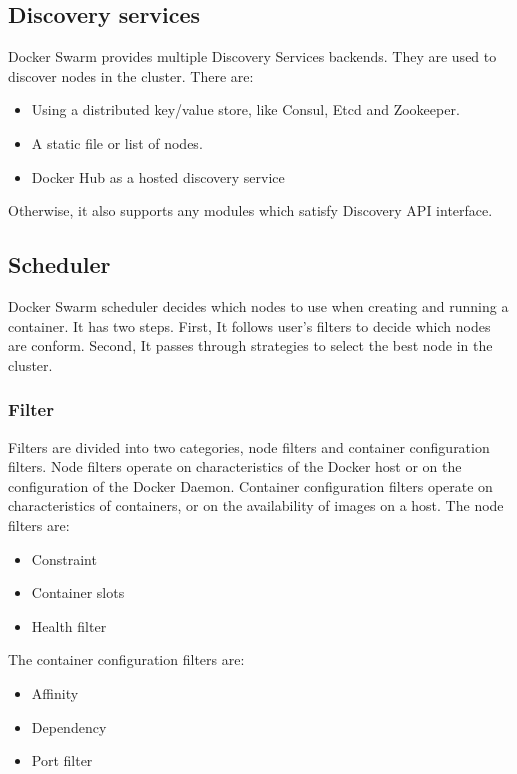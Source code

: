 \subsection{Discovery services}
Docker Swarm provides multiple Discovery Services backends. They are used to discover nodes in the cluster. There are:
\begin{itemize}
    \item Using a distributed key/value store, like Consul, Etcd and Zookeeper.
    \item A static file or list of nodes.
    \item Docker Hub as a hosted discovery service
\end{itemize}
Otherwise, it also supports any modules which satisfy Discovery API interface.

\subsection{Scheduler}
Docker Swarm scheduler decides which nodes to use when creating and running a container. It has two steps. First, It follows user's filters to decide which nodes are conform. Second, It passes through strategies to select the best node in the cluster.

\subsubsection{Filter}
Filters are divided into two categories, node filters and container configuration filters. Node filters operate on characteristics of the Docker host or on the configuration of the Docker Daemon. Container configuration filters operate on characteristics of containers, or on the availability of images on a host.
The node filters are:
\begin{itemize}
    \item Constraint
    \item Container slots
    \item Health filter
\end{itemize}
The container configuration filters are:
\begin{itemize}
    \item Affinity
    \item Dependency
    \item Port filter
\end{itemize}

